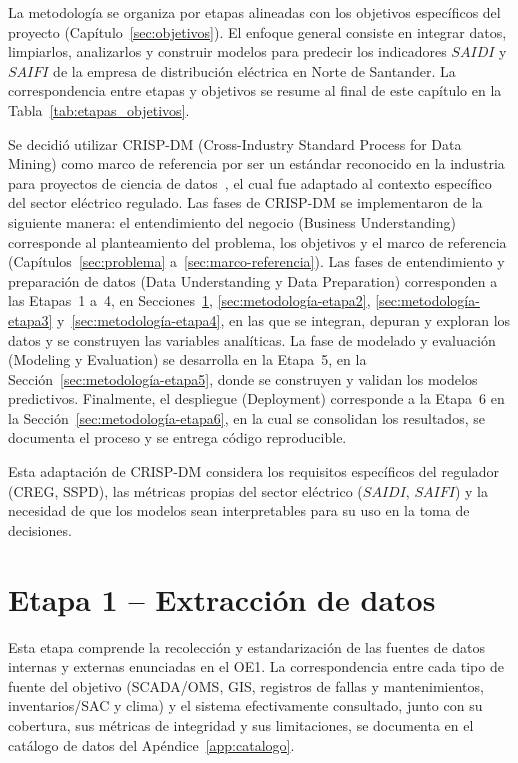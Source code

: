 
La metodología se organiza por etapas alineadas con los objetivos específicos del proyecto (Capítulo~\ref{sec:objetivos}). El enfoque general consiste en integrar datos, limpiarlos, analizarlos y construir modelos para predecir los indicadores $SAIDI$ y $SAIFI$ de la empresa de distribución eléctrica en Norte de Santander. La correspondencia entre etapas y objetivos se resume al final de este capítulo en la Tabla~\ref{tab:etapas_objetivos}.

Se decidió utilizar CRISP-DM (Cross-Industry Standard Process for Data Mining) como marco de referencia por ser un estándar reconocido en la industria para proyectos de ciencia de datos~\cite{ref45}, el cual fue adaptado al contexto específico del sector eléctrico regulado. Las fases de CRISP-DM se implementaron de la siguiente manera: el entendimiento del negocio (Business Understanding) corresponde al planteamiento del problema, los objetivos y el marco de referencia (Capítulos~\ref{sec:problema} a~\ref{sec:marco-referencia}). Las fases de entendimiento y preparación de datos (Data Understanding y Data Preparation) corresponden a las Etapas~1 a~4, en Secciones~\ref{sec:metodología-etapa1}, \ref{sec:metodología-etapa2}, \ref{sec:metodología-etapa3} y~\ref{sec:metodología-etapa4}, en las que se integran, depuran y exploran los datos y se construyen las variables analíticas. La fase de modelado y evaluación (Modeling y Evaluation) se desarrolla en la Etapa~5, en la Sección~\ref{sec:metodología-etapa5}, donde se construyen y validan los modelos predictivos. Finalmente, el despliegue (Deployment) corresponde a la Etapa~6 en la Sección~\ref{sec:metodología-etapa6}, en la cual se consolidan los resultados, se documenta el proceso y se entrega código reproducible.

Esta adaptación de CRISP-DM considera los requisitos específicos del regulador (CREG, SSPD), las métricas propias del sector eléctrico ($SAIDI$, $SAIFI$) y la necesidad de que los modelos sean interpretables para su uso en la toma de decisiones.

\section{Etapa 1 – Extracción de datos}
\label{sec:metodología-etapa1}

Esta etapa comprende la recolección y estandarización de las fuentes de datos internas y externas enunciadas en el OE1. La correspondencia entre cada tipo de fuente del objetivo (SCADA/OMS, GIS, registros de fallas y mantenimientos, inventarios/SAC y clima) y el sistema efectivamente consultado, junto con su cobertura, sus métricas de integridad y sus limitaciones, se documenta en el catálogo de datos del Apéndice~\ref{app:catalogo}.

